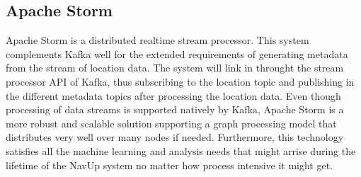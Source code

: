 \subsection{Apache Storm}
Apache Storm is a distributed realtime stream processor. This system complements Kafka well for the extended requirements of generating metadata from the stream of location data. The system will link in throught the stream processor API of Kafka, thus subscribing to the location topic and publishing in the different metadata topics after processing the location data. Even though processing of data streams is supported natively by Kafka, Apache Storm is a more robust and scalable solution supporting a graph processing model that distributes very well over many nodes if needed. Furthermore, this technology satisfies all the machine learning and analysis needs that might arrise during the lifetime of the NavUp system no matter how process intensive it might get.
